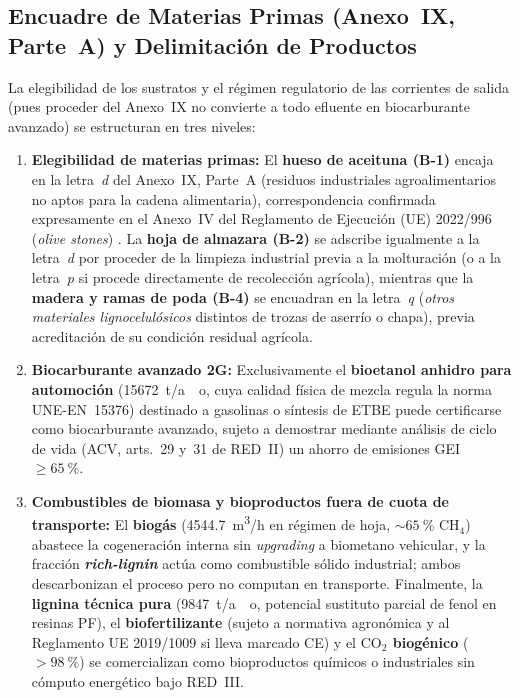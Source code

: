 \documentclass{report}
\begin{document}
\subsection*{Encuadre de Materias Primas (Anexo~IX, Parte~A) y Delimitación de Productos}
La elegibilidad de los sustratos y el régimen regulatorio de las corrientes de salida (pues proceder del Anexo~IX no convierte a todo efluente en biocarburante avanzado) se estructuran en tres niveles:
\begin{enumerate}
    \item \textbf{Elegibilidad de materias primas:} El \textbf{hueso de aceituna (B-1)} encaja en la letra~\textit{d} del Anexo~IX, Parte~A (residuos industriales agroalimentarios no aptos para la cadena alimentaria), correspondencia confirmada expresamente en el Anexo~IV del Reglamento de Ejecución (UE) 2022/996 (\textit{olive stones}) \autocite{UE2022_996}. La \textbf{hoja de almazara (B-2)} se adscribe igualmente a la letra~\textit{d} por proceder de la limpieza industrial previa a la molturación (o a la letra~\textit{p} si procede directamente de recolección agrícola), mientras que la \textbf{madera y ramas de poda (B-4)} se encuadran en la letra~\textit{q} (\textit{otros materiales lignocelulósicos} distintos de trozas de aserrío o chapa), previa acreditación de su condición residual agrícola.
    \item \textbf{Biocarburante avanzado 2G:} Exclusivamente el \textbf{bioetanol anhidro para automoción} (\SI{15672}{\tonne/ao}, cuya calidad física de mezcla regula la norma UNE-EN~15376) destinado a gasolinas o síntesis de ETBE puede certificarse como biocarburante avanzado, sujeto a demostrar mediante análisis de ciclo de vida (ACV, arts.~29 y~31 de RED~II) un ahorro de emisiones GEI $\ge \SI{65}{\percent}$.
    \item \textbf{Combustibles de biomasa y bioproductos fuera de cuota de transporte:} El \textbf{biogás} (\SI{4544.7}{\cubic\meter/\hour} en régimen de hoja, $\sim \SI{65}{\percent}$ $\text{CH}_4$) abastece la cogeneración interna sin \textit{upgrading} a biometano vehicular, y la fracción \textbf{\textit{rich-lignin}} actúa como combustible sólido industrial; ambos descarbonizan el proceso pero no computan en transporte. Finalmente, la \textbf{lignina técnica pura} (\SI{9847}{\tonne/ao}, potencial sustituto parcial de fenol en resinas PF), el \textbf{biofertilizante} (sujeto a normativa agronómica y al Reglamento UE 2019/1009 si lleva marcado CE) y el \textbf{$\text{CO}_2$ biogénico} ($>\SI{98}{\percent}$) se comercializan como bioproductos químicos o industriales sin cómputo energético bajo RED~III.
\end{enumerate}
\end{document}
